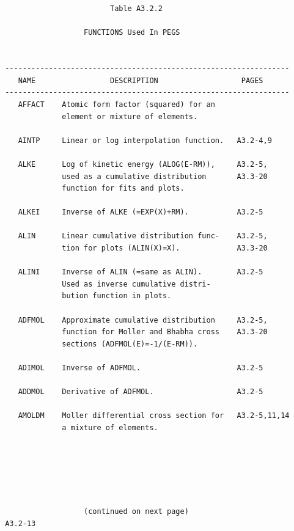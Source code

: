 \newpage  {} \begin{verbatim}
 
 
                         Table A3.2.2
 
                   FUNCTIONS Used In PEGS
 
 
 -----------------------------------------------------------------
    NAME                 DESCRIPTION                   PAGES
 -----------------------------------------------------------------
    AFFACT    Atomic form factor (squared) for an
              element or mixture of elements.
 
    AINTP     Linear or log interpolation function.   A3.2-4,9
 
    ALKE      Log of kinetic energy (ALOG(E-RM)),     A3.2-5,
              used as a cumulative distribution       A3.3-20
              function for fits and plots.
 
    ALKEI     Inverse of ALKE (=EXP(X)+RM).           A3.2-5
 
    ALIN      Linear cumulative distribution func-    A3.2-5,
              tion for plots (ALIN(X)=X).             A3.3-20
 
    ALINI     Inverse of ALIN (=same as ALIN).        A3.2-5
              Used as inverse cumulative distri-
              bution function in plots.
 
    ADFMOL    Approximate cumulative distribution     A3.2-5,
              function for Moller and Bhabha cross    A3.3-20
              sections (ADFMOL(E)=-1/(E-RM)).
 
    ADIMOL    Inverse of ADFMOL.                      A3.2-5
 
    ADDMOL    Derivative of ADFMOL.                   A3.2-5
 
    AMOLDM    Moller differential cross section for   A3.2-5,11,14
              a mixture of elements.
 
 
 
 
 
 
                   (continued on next page)
 A3.2-13
\end{verbatim} 
